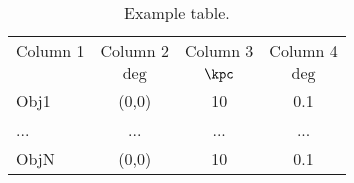 \begin{table}
  \begin{center}
  \caption{Example table. \label{tab:example}}
  \begin{tabular}{lccc}
\hline\hline
Column 1 & Column 2 & Column 3 &  Column 4 \\[3pt]  
     &    $\deg$     & $\kpc$   &  $\deg$ \\[4pt]
\hline
Obj1 & (0,0) & 10 & 0.1 \\
... & ... & ... & ... \\
ObjN & (0,0) & 10 & 0.1
\\\hline\hline
\end{tabular}
\end{center}
\end{table}

